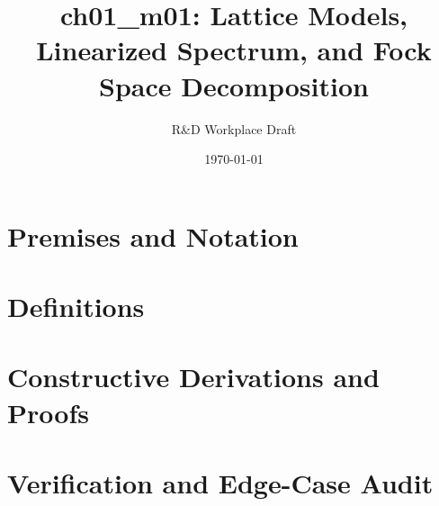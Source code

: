 \documentclass[11pt,a4paper]{article}
\title{\textbf{ch01\_m01: Lattice Models, Linearized Spectrum, and Fock Space Decomposition}}
\author{R\&D Workplace Draft}
\date{\today}
\theoremstyle{definition}
\theoremstyle{plain}
\theoremstyle{remark}
\begin{document}
\maketitle

\section{Premises and Notation}

\section{Definitions}

\section{Constructive Derivations and Proofs}

\section{Verification and Edge-Case Audit}
\end{document}
